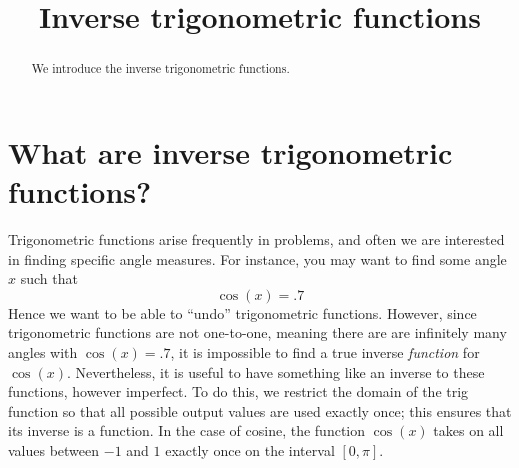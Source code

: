 \documentclass{ximera}
\title{Inverse trigonometric functions}
\begin{document}
\begin{abstract}
  We introduce the inverse trigonometric functions.
\end{abstract}
\maketitle


\section{What are inverse trigonometric functions?}


Trigonometric functions arise frequently in problems, and often we are
interested in finding specific angle measures. For instance, you may
want to find some angle $x$ such that
\[
\cos(x) = .7
\]
Hence we want to be able to ``undo'' trigonometric functions. However, since
trigonometric functions are not one-to-one, meaning there are are
infinitely many angles with $\cos(x) = .7$, it is impossible to
find a true inverse \emph{function} for $\cos(x)$. Nevertheless, it is
useful to have something like an inverse to these functions, however
imperfect. To do this, we restrict the domain of the trig function so that all possible output values are used exactly once; this ensures that its inverse is a function. In the case of cosine, the function $\cos(x)$ takes on all
values between $-1$ and $1$ exactly once on the interval $[0,\pi]$.

\end{document}
